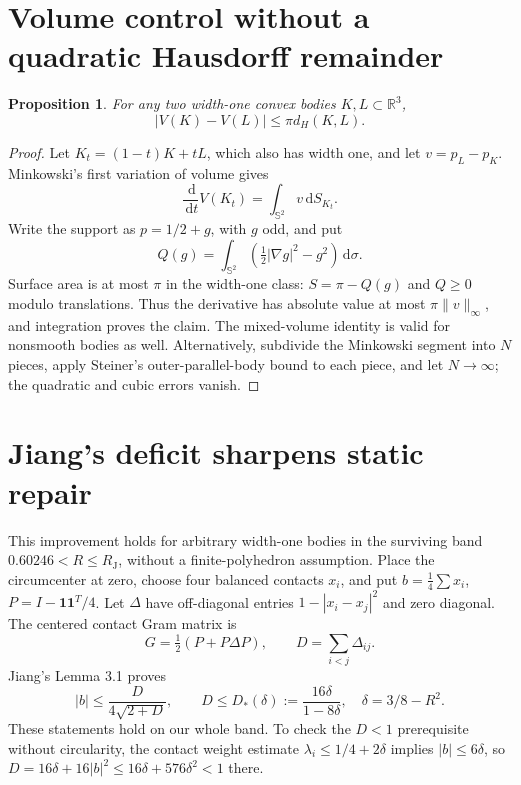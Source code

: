 \documentclass[11pt]{article}
\newtheorem{proposition}[theorem]{Proposition}
\theoremstyle{remark}\newtheorem{remark}[theorem]{Remark}
\newcommand{\Sph}{\mathbb S^2}
\newcommand{\RJ}{R_{\mathrm J}}
\newcommand{\dd}{\,\mathrm d}
\begin{document}
\section{Volume control without a quadratic Hausdorff remainder}
\begin{proposition}\label{completion:volumeLip}
For any two width-one convex bodies $K,L\subset\mathbb R^3$,
\begin{equation}\label{completion:lipschitz}
 |V(K)-V(L)|\leq\pi d_H(K,L).
\end{equation}
\end{proposition}
\begin{proof}
Let $K_t=(1-t)K+tL$, which also has width one, and let $v=p_L-p_K$. Minkowski's first variation of volume gives
\[
 \frac{\dd}{\dd t}V(K_t)=\int_{\Sph}v\dd S_{K_t}.
\]
Write the support as $p=1/2+g$, with $g$ odd, and put
\[
 Q(g)=\int_{\Sph}(\tfrac12|\nabla g|^2-g^2)\dd\sigma.
\]
Surface area is at most $\pi$ in the width-one class: $S=\pi-Q(g)$ and $Q\geq0$ modulo translations. Thus the derivative has absolute value at most $\pi\|v\|_\infty$, and integration proves the claim. The mixed-volume identity is valid for nonsmooth bodies as well. Alternatively, subdivide the Minkowski segment into $N$ pieces, apply Steiner's outer-parallel-body bound to each piece, and let $N\to\infty$; the quadratic and cubic errors vanish.
\end{proof}

\section{Jiang's deficit sharpens static repair}
This improvement holds for arbitrary width-one bodies in the surviving
band $0.60246<R\leq\RJ$, without a finite-polyhedron assumption.
Place the circumcenter at zero, choose four balanced contacts $x_i$, and put
$b=\frac14\sum x_i$, $P=I-\mathbf1\mathbf1^T/4$.
Let $\Delta$ have off-diagonal entries $1-|x_i-x_j|^2$ and zero diagonal.
The centered contact Gram matrix is
\[
 G=\tfrac12(P+P\Delta P),\qquad D=\sum_{i<j}\Delta_{ij}.
\]
Jiang's Lemma 3.1 proves
\begin{equation}\label{jiang:jiang}
 |b|\leq\frac{D}{4\sqrt{2+D}},\qquad
 D\leq D_*(\delta):=\frac{16\delta}{1-8\delta},\quad
 \delta=3/8-R^2.
\end{equation}
These statements hold on our whole band. To check the $D<1$ prerequisite
without circularity, the contact weight estimate
$\lambda_i\leq1/4+2\delta$ implies $|b|\leq6\delta$, so
$D=16\delta+16|b|^2\leq16\delta+576\delta^2<1$ there.
\end{document}
